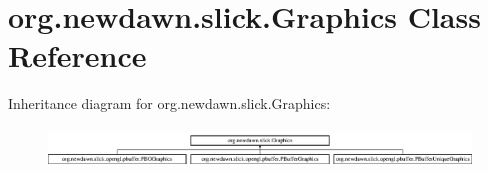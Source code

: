 \hypertarget{classorg_1_1newdawn_1_1slick_1_1_graphics}{}\section{org.\+newdawn.\+slick.\+Graphics Class Reference}
\label{classorg_1_1newdawn_1_1slick_1_1_graphics}
Inheritance diagram for org.\+newdawn.\+slick.\+Graphics\+:\begin{figure}[H]
\begin{center}
\leavevmode
\includegraphics[height=1.072797cm]{classorg_1_1newdawn_1_1slick_1_1_graphics}
\end{center}
\end{figure}
